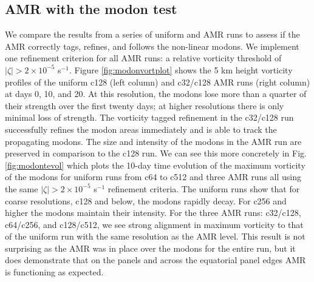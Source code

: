 \subsection{AMR with the modon test}
We compare the results from a series of uniform and AMR runs to assess
if the AMR correctly tags, refines, and follows the non-linear modons.
We implement one refinement criterion for all AMR runs: 
a relative vorticity threshold of $|\zeta| > 2 \times 10^{-5}$ s$^{-1}$.
Figure \ref{fig:modonvortplot} shows the 5 km height vorticity profiles of 
the uniform c128 (left column) and c32/c128 AMR runs (right column) at
days 0, 10, and 20. At this resolution, the modons lose more than a quarter of 
their strength over the first twenty days; at higher resolutions there is only minimal
loss of strength.
The vorticity tagged refinement in the c32/c128 run successfully
refines the modon areas immediately and is able to track
the propagating modons. The size and intensity 
of the modons in the AMR run are preserved in comparison to the c128 run. 
We can see this more concretely in Fig.
\ref{fig:modontevol} which plots the 10-day time evolution of the 
maximum vorticity of the modons for uniform runs from c64 to c512 and three AMR runs
all using the same $|\zeta| > 2 \times 10^{-5}$ s$^{-1}$ refinement criteria. The uniform runs
show that for coarse resolutions, c128 and below, the modons rapidly decay. For c256 and
higher the modons maintain their intensity. For the three AMR runs: c32/c128,
c64/c256, and c128/c512, we see strong alignment in maximum vorticity to
that of the uniform run with the same resolution as the AMR level. This result is
not surprising as the AMR was in place over the modons for the entire run, but it
does demonstrate that on the panels and across the equatorial panel edges AMR is
functioning as expected.

